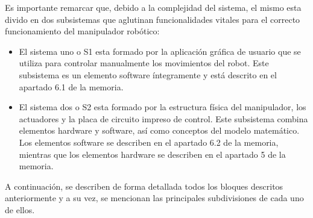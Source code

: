 Es importante remarcar que, debido a la complejidad del sistema, el mismo esta divido en dos subsistemas que aglutinan funcionalidades vitales para el correcto funcionamiento del manipulador robótico:
\begin{itemize}
    \item El sistema uno o S1 esta formado por la aplicación gráfica de usuario que se utiliza para controlar manualmente los movimientos del robot. Este subsistema es un elemento software íntegramente y está descrito en el apartado 6.1 de la memoria.
    
    \item El sistema dos o S2 esta formado por la estructura física del manipulador, los actuadores y la placa de circuito impreso de control. Este subsistema combina elementos hardware y software, así como conceptos del modelo matemático. Los elementos software se describen en el apartado 6.2 de la memoria, mientras que los elementos hardware se describen en el apartado 5 de la memoria.
\end{itemize}

A continuación, se describen de forma detallada todos los bloques descritos anteriormente y a su vez, se mencionan las principales subdivisiones de cada uno de ellos.\\
